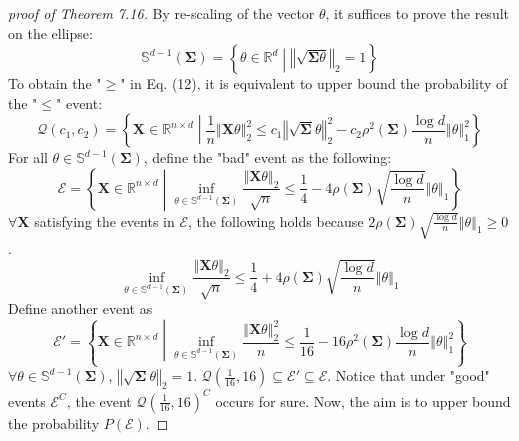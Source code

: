 \documentclass[a4paper, 11pt]{article}
\begin{document}
\begin{proof}[proof of Theorem 7.16]\renewcommand{\qedsymbol}{}

By re-scaling of the vector $\theta$, it suffices to prove the result on the ellipse: 
\begin{equation}
\mathbb{S}^{d-1}(\mathbf{\Sigma}) = \left\{ \theta\in\mathbb{R}^d \middle| \left\Vert \sqrt{\mathbf{\Sigma}\theta} \right\Vert_2 = 1 \right\}
\end{equation}
To obtain the "$\geq$" in Eq. (12), it is equivalent to upper bound the probability of the "$\leq$" event: 
\begin{equation}
\mathcal{Q}(c_1, c_2) = \left\{ \mathbf{X}\in\mathbb{R}^{n\times d} \middle| \frac{1}{n}\left\Vert\mathbf{X}\theta \right\Vert_2^2 \leq c_1\left\Vert\sqrt{\mathbf{\Sigma}}\theta \right\Vert_2^2 - c_2\rho^2(\mathbf{\Sigma})\frac{\log d}{n}\left\Vert\theta \right\Vert_1^2 \right\}
\end{equation}
For all $\theta\in\mathbb{S}^{d-1}(\mathbf{\Sigma})$, define the "bad" event as the following: 
\begin{equation}
\mathcal{E} = \left\{\mathbf{X}\in\mathbb{R}^{n\times d} \middle| \inf_{\theta\in\mathbb{S}^{d-1}(\mathbf{\Sigma})} \frac{\left\Vert\mathbf{X}\theta \right\Vert_2}{\sqrt{n}} \leq \frac{1}{4} - 4\rho(\mathbf{\Sigma})\sqrt{\frac{\log d}{n}}\left\Vert\theta \right\Vert_1 \right\}
\end{equation}
$\forall \mathbf{X}$ satisfying the events in $\mathcal{E}$, the following holds because $2\rho(\mathbf{\Sigma})\sqrt{\frac{\log d}{n}}\left\Vert\theta \right\Vert_1 \geq 0$. 
\begin{equation}
\inf_{\theta\in\mathbb{S}^{d-1}(\mathbf{\Sigma})} \frac{\left\Vert\mathbf{X}\theta \right\Vert_2}{\sqrt{n}} \leq \frac{1}{4} + 4\rho(\mathbf{\Sigma})\sqrt{\frac{\log d}{n}}\left\Vert\theta \right\Vert_1
\end{equation}
Define another event as 
\begin{equation}
\mathcal{E}' = \left\{\mathbf{X}\in\mathbb{R}^{n\times d} \middle| \inf_{\theta\in\mathbb{S}^{d-1}(\mathbf{\Sigma})} \frac{\left\Vert\mathbf{X}\theta \right\Vert_2^2}{n} \leq \frac{1}{16} - 16\rho^2(\mathbf{\Sigma})\frac{\log d}{n}\left\Vert\theta \right\Vert_1^2 \right\}
\end{equation}
$\forall\theta\in\mathbb{S}^{d-1}(\mathbf{\Sigma})$, $\left\Vert\sqrt{\mathbf{\Sigma}}\theta \right\Vert_2=1$. $\mathcal{Q}\left(\frac{1}{16}, 16\right) \subseteq \mathcal{E}' \subseteq \mathcal{E}$. Notice that under "good" events $\mathcal{E}^C$, the event $\mathcal{Q}\left(\frac{1}{16}, 16\right)^C$ occurs for sure. Now, the aim is to upper bound the probability $P(\mathcal{E})$. 


\end{proof}
\end{document}

